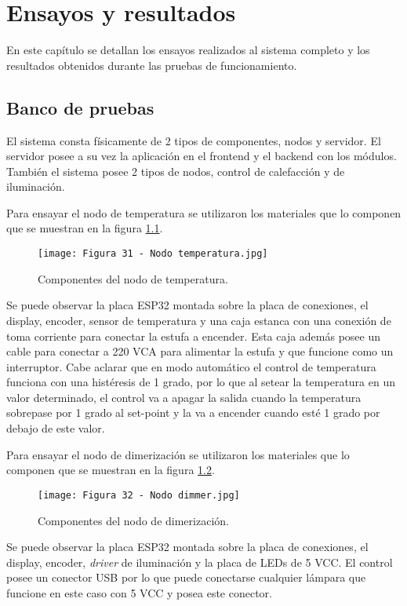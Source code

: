 \chapter{Ensayos y resultados}

\label{Chapter4}

En este capítulo se detallan los ensayos realizados al sistema completo y los resultados obtenidos durante las pruebas de funcionamiento.

\section{Banco de pruebas}

El sistema consta físicamente de 2 tipos de componentes, nodos y servidor. El servidor posee a su vez la aplicación en el frontend y el backend con los módulos. También el sistema posee 2 tipos de nodos, control de calefacción y de iluminación.

Para ensayar el nodo de temperatura se utilizaron los materiales que lo componen que se muestran en la figura \ref{fig:31}.

\begin{figure}[h]
\centering
\texttt{[image: Figura 31 - Nodo temperatura.jpg]}
\caption[Nodo temperatura]{Componentes del nodo de temperatura.}
\label{fig:31}
\end{figure}

Se puede observar la placa ESP32 montada sobre la placa de conexiones, el display, encoder, sensor de temperatura y una caja estanca con una conexión de toma corriente para conectar la estufa a encender. Esta caja además posee un cable para conectar a 220 VCA para alimentar la estufa y que funcione como un interruptor. Cabe aclarar que en modo automático el control de temperatura funciona con una histéresis de 1 grado, por lo que al setear la temperatura en un valor determinado, el control va a apagar la salida cuando la temperatura sobrepase por 1 grado al set-point y la va a encender cuando esté 1 grado por debajo de este valor.

Para ensayar el nodo de dimerización se utilizaron los materiales que lo componen que se muestran en la figura \ref{fig:32}.

\begin{figure}[h]
\centering
\texttt{[image: Figura 32 - Nodo dimmer.jpg]}
\caption[Nodo dimmer]{Componentes del nodo de dimerización.}
\label{fig:32}
\end{figure}

Se puede observar la placa ESP32 montada sobre la placa de conexiones, el display, encoder, \textit{driver} de iluminación y la placa de LEDs de 5 VCC. El control posee un conector USB por lo que puede conectarse cualquier lámpara que funcione en este caso con 5 VCC y posea este conector.

